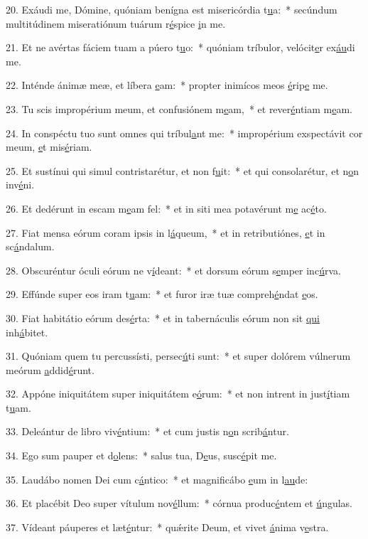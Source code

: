 20. Exáudi me, Dómine, quóniam benígna est misericórdia t\uline{u}a:~* secúndum multitúdinem miseratiónum tuárum r\uline{é}spice \uline{i}n me.\par 
21. Et ne avértas fáciem tuam a púero t\uline{u}o:~* quóniam tríbulor, velócit\uline{e}r ex\uline{áu}di me.\par 
22. Inténde ánimæ meæ, et líbera \uline{e}am:~* propter inimícos meos \uline{é}rip\uline{e} me.\par 
23. Tu scis impropérium meum, et confusiónem m\uline{e}am,~* et rever\uline{é}ntiam m\uline{e}am.\par 
24. In conspéctu tuo sunt omnes qui tríbul\uline{a}nt me:~* impropérium exspectávit cor meum, \uline{e}t mis\uline{é}riam.\par 
25. Et sustínui qui simul contristarétur, et non f\uline{u}it:~* et qui consolarétur, et n\uline{o}n inv\uline{é}ni.\par 
26. Et dedérunt in escam m\uline{e}am fel:~* et in siti mea potavérunt m\uline{e} ac\uline{é}to.\par 
27. Fiat mensa eórum coram ipsis in l\uline{á}queum,~* et in retributiónes, \uline{e}t in sc\uline{á}ndalum.\par 
28. Obscuréntur óculi eórum ne v\uline{í}deant:~* et dorsum eórum s\uline{e}mper inc\uline{ú}rva.\par 
29. Effúnde super eos iram t\uline{u}am:~* et furor iræ tuæ compreh\uline{é}ndat \uline{e}os.\par 
30. Fiat habitátio eórum des\uline{é}rta:~* et in tabernáculis eórum non sit \uline{qui} inh\uline{á}bitet.\par 
31. Quóniam quem tu percussísti, persec\uline{ú}ti sunt:~* et super dolórem vúlnerum meórum \uline{a}ddid\uline{é}runt.\par 
32. Appóne iniquitátem super iniquitátem e\uline{ó}rum:~* et non intrent in just\uline{í}tiam t\uline{u}am.\par 
33. Deleántur de libro viv\uline{é}ntium:~* et cum justis n\uline{o}n scrib\uline{á}ntur.\par 
34. Ego sum pauper et d\uline{o}lens:~* salus tua, D\uline{e}us, susc\uline{é}pit me.\par 
35. Laudábo nomen Dei cum c\uline{á}ntico:~* et magnificábo \uline{e}um in l\uline{au}de:\par 
36. Et placébit Deo super vítulum nov\uline{é}llum:~* córnua produc\uline{é}ntem et \uline{ú}ngulas.\par 
37. Vídeant páuperes et læt\uline{é}ntur:~* quǽrite Deum, et vivet \uline{á}nima v\uline{e}stra.\par 
